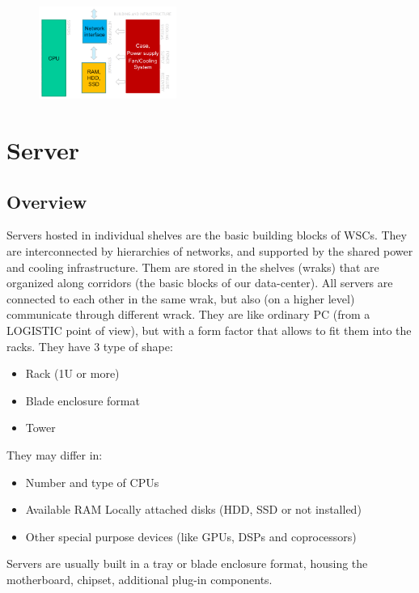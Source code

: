 \documentclass[10pt, oneside]{article}
\begin{document}
\begin{figure}[H]
    \begin{center}
    \includegraphics[width=0.4\textwidth]{img/img7.png}
    \caption{}
    \label{fig:WSCs overview2}
    \end{center}
\end{figure}
\section{Server}
\subsection{Overview}
Servers hosted in individual shelves are the basic building blocks of WSCs. They are interconnected by hierarchies of networks, and supported by the shared power and cooling infrastructure. Them are stored in the shelves (wraks) that are organized along corridors (the basic blocks of our data-center). All servers are connected to each other in the same wrak, but also (on a higher level) communicate through different wrack.
They are like ordinary PC (from a LOGISTIC point of view), but with a form factor that allows to fit them into the racks. They have 3 type of shape:
    \begin{itemize}
        \item Rack (1U or more)
        \item Blade enclosure format 
        \item Tower
    \end{itemize} 
    They may differ in: 
    \begin{itemize}
        \item Number and type of CPUs
        \item Available RAM Locally attached disks (HDD, SSD or not installed)
        \item Other special purpose devices (like GPUs, DSPs and coprocessors)
    \end{itemize}  
Servers are usually built in a tray or blade enclosure format, housing
the motherboard, chipset, additional plug-in components.
\end{document}
